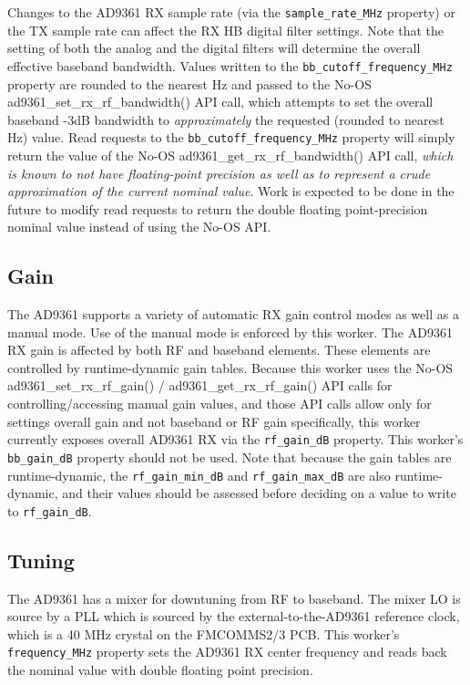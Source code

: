 Changes to the AD9361 RX sample rate (via the \verb+sample_rate_MHz+ property) or the TX sample rate can affect the RX HB digital filter settings. Note that the setting of both the analog and the digital filters will determine the overall effective baseband bandwidth. Values written to the \verb+bb_cutoff_frequency_MHz+ property are rounded to the nearest Hz and passed to the No-OS ad9361\_set\_rx\_rf\_bandwidth() API call, which attempts to set the overall baseband -3dB bandwidth to \textit{approximately} the requested (rounded to nearest Hz) value. Read requests to the \verb+bb_cutoff_frequency_MHz+ property will simply return the value of the No-OS ad9361\_get\_rx\_rf\_bandwidth() API call, \textit{which is known to not have floating-point precision as well as to represent a crude approximation of the current nominal value}. Work is expected to be done in the future to modify read requests to return the double floating point-precision nominal value instead of using the No-OS API.
\subsection*{Gain}
The AD9361 supports a variety of automatic RX gain control modes as well as a manual mode. Use of the manual mode is enforced by this worker. The AD9361 RX gain is affected by both RF and baseband elements. These elements are controlled by runtime-dynamic gain tables. Because this worker uses the No-OS ad9361\_set\_rx\_rf\_gain() / ad9361\_get\_rx\_rf\_gain() API calls for controlling/accessing manual gain values, and those API calls allow only for settings overall gain and not baseband or RF gain specifically, this worker currently exposes overall AD9361 RX via the \verb+rf_gain_dB+ property. This worker's \verb+bb_gain_dB+ property should not be used. Note that because the gain tables are runtime-dynamic, the \verb+rf_gain_min_dB+ and \verb+rf_gain_max_dB+ are also runtime-dynamic, and their values should be assessed before deciding on a value to write to \verb+rf_gain_dB+.
\subsection*{Tuning}
The AD9361 has a mixer for downtuning from RF to baseband. The mixer LO is source by a PLL which is sourced by the external-to-the-AD9361 reference clock, which is a 40 MHz crystal on the FMCOMMS2/3 PCB. This worker's \verb+frequency_MHz+ property sets the AD9361 RX center frequency and reads back the nominal value with double floating point precision.

